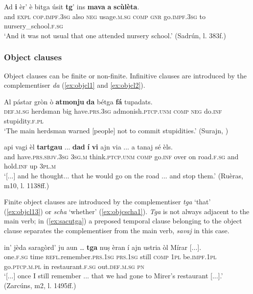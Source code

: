 \ea
\label{ex:subjclaus10}
\gll Ad \textbf{i} èr’ è bitga úsit \textbf{tg}’ ins \textbf{mava} \textbf{a} \textbf{scùlèta}.\\
and  \textsc{expl} \textsc{cop.impf.3sg} also \textsc{neg} usage.\textsc{m.sg}  \textsc{comp} \textsc{gnr} go.\textsc{impf.3sg} to nursery\_school.\textsc{f.sg}\\
\glt `And it was not usual that one attended nursery school.' (Sadrún, l. 383f.)
\z 


\subsubsection{Object clauses}
Object clauses can be finite or non-finite. Infinitive clauses are introduced by the complementiser \textit{da} (\ref{ex:objcl1} and \ref{ex:objcl2}).

\ea
\label{ex:objcl1}
\gll Al pástar gròn ò \textbf{atmonju} \textbf{da} bétga \textbf{fá} tupadats.\\
\textsc{def.m.sg} herdsman big have.\textsc{prs.3sg} admonish.\textsc{ptcp.unm} \textsc{comp} \textsc{neg} do.\textsc{inf} stupidity.\textsc{f.pl}\\
\glt `The main herdsman warned [people] not to commit stupidities.' (Surajn, \citealt[128]{Büchli1966})
\z

\ea
\label{ex:objcl2}
\gll  [...] api vagi èl \textbf{tartgau} ... \textbf{dad} \textbf{í} \textbf{vi} ajn via ... a tanaj sé èls.  \\
{} and have.\textsc{prs.sbjv.3sg} \textsc{3sg.m} think.\textsc{ptcp.unm} {} \textsc{comp} go.\textsc{inf} over on road.\textsc{f.sg} {} and hold.\textsc{inf} up \textsc{3pl.m}\\
\glt `[...] and he thought... that he would go on the road ... and stop them.' (Ruèras, m10, l. 1138ff.)
\z

Finite object clauses are introduced by the complementiser \textit{tga} `that' (\ref{ex:objcl13}) or \textit{scha} `whether' (\ref{ex:objcscha1}). \textit{Tga} is not always adjacent to the main verb; in (\ref{ex:sacutga}) a preposed temporal clause belonging to the object clause separates the complementiser from the main verb, \textit{savaj} in this case.

\ea
\label{ex:objcl13}
\gll    [...] in’ jèda saragòrd’ ju aun … \textbf{tga} nuṣ èran í ajn ustria òl Mírar [...].\\
one.\textsc{f.sg} time \textsc{refl}.remember.\textsc{prs.1sg} \textsc{prs.1sg} still {} \textsc{comp} \textsc{1pl} be.\textsc{impf.1pl} go.\textsc{ptcp.m.pl} in restaurant.\textsc{f.sg} out.\textsc{def.m.sg} \textsc{pn}\\
\glt `[...] once I still remember ... that we had gone to Mirer's restaurant [...].' (Zarcúns, m2, l. 1495ff.)
\z

